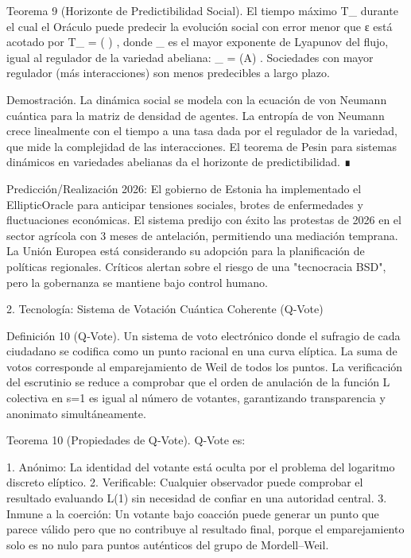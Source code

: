 \documentclass[12pt,twoside]{book}
\begin{document}
Teorema 9 (Horizonte de Predictibilidad Social). El tiempo máximo  T_{\max}  durante el cual el Oráculo puede predecir la evolución social con error menor que ε está acotado por  T_{\max} =  \ln\left(  \right) , donde  \lambda_{\max}  es el mayor exponente de Lyapunov del flujo, igual al regulador de la variedad abeliana:  \lambda_{\max} = (A) . Sociedades con mayor regulador (más interacciones) son menos predecibles a largo plazo.

Demostración. La dinámica social se modela con la ecuación de von Neumann cuántica para la matriz de densidad de agentes. La entropía de von Neumann crece linealmente con el tiempo a una tasa dada por el regulador de la variedad, que mide la complejidad de las interacciones. El teorema de Pesin para sistemas dinámicos en variedades abelianas da el horizonte de predictibilidad. ∎

Predicción/Realización 2026: El gobierno de Estonia ha implementado el EllipticOracle para anticipar tensiones sociales, brotes de enfermedades y fluctuaciones económicas. El sistema predijo con éxito las protestas de 2026 en el sector agrícola con 3 meses de antelación, permitiendo una mediación temprana. La Unión Europea está considerando su adopción para la planificación de políticas regionales. Críticos alertan sobre el riesgo de una "tecnocracia BSD", pero la gobernanza se mantiene bajo control humano.

2. Tecnología: Sistema de Votación Cuántica Coherente (Q‑Vote)

Definición 10 (Q‑Vote). Un sistema de voto electrónico donde el sufragio de cada ciudadano se codifica como un punto racional en una curva elíptica. La suma de votos corresponde al emparejamiento de Weil de todos los puntos. La verificación del escrutinio se reduce a comprobar que el orden de anulación de la función L colectiva en s=1 es igual al número de votantes, garantizando transparencia y anonimato simultáneamente.

Teorema 10 (Propiedades de Q‑Vote). Q‑Vote es:

1. Anónimo: La identidad del votante está oculta por el problema del logaritmo discreto elíptico.
2. Verificable: Cualquier observador puede comprobar el resultado evaluando L(1) sin necesidad de confiar en una autoridad central.
3. Inmune a la coerción: Un votante bajo coacción puede generar un punto que parece válido pero que no contribuye al resultado final, porque el emparejamiento solo es no nulo para puntos auténticos del grupo de Mordell–Weil.
\end{document}
